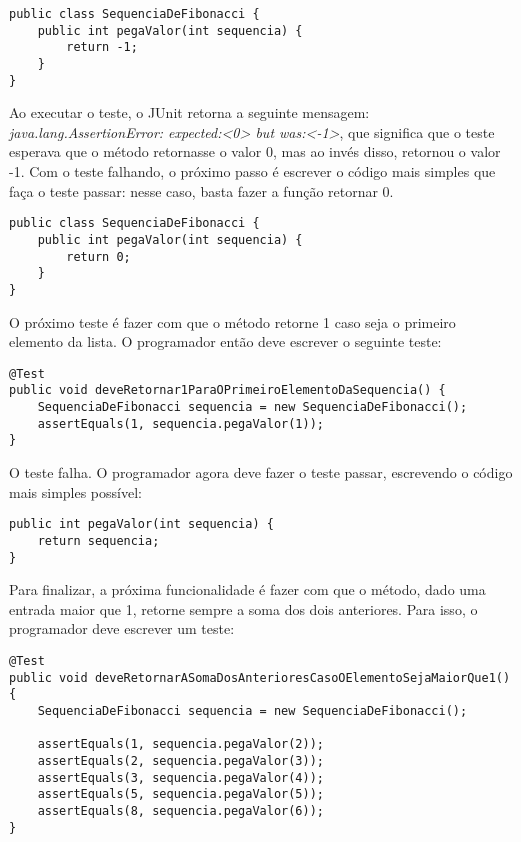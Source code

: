 \begin{lstlisting}[frame=trbl]
public class SequenciaDeFibonacci {
	public int pegaValor(int sequencia) {
		return -1;
	}
}
\end{lstlisting}

Ao executar o teste, o JUnit retorna a seguinte mensagem: \textit{java.lang.AssertionError: expected:<0> but was:<-1>}, que significa que
o teste esperava que o método retornasse o valor 0, mas ao invés disso, retornou o valor -1. Com o teste falhando, o próximo passo é escrever
o código mais simples que faça o teste passar: nesse caso, basta fazer a função retornar 0.

\begin{lstlisting}[frame=trbl]
public class SequenciaDeFibonacci {
	public int pegaValor(int sequencia) {
		return 0;
	}
}
\end{lstlisting}

O próximo teste é fazer com que o método retorne 1 caso seja o primeiro elemento da lista. O programador então deve escrever o
seguinte teste:

\begin{lstlisting}[frame=trbl]
@Test
public void deveRetornar1ParaOPrimeiroElementoDaSequencia() {
	SequenciaDeFibonacci sequencia = new SequenciaDeFibonacci();
	assertEquals(1, sequencia.pegaValor(1));		
}
\end{lstlisting}

O teste falha. O programador agora deve fazer o teste passar, escrevendo o código mais simples possível:

\begin{lstlisting}[frame=trbl]
public int pegaValor(int sequencia) {
	return sequencia;
}
\end{lstlisting}

Para finalizar, a próxima funcionalidade é fazer com que o método, dado uma entrada maior que 1, retorne sempre a soma dos dois anteriores.
Para isso, o programador deve escrever um teste:

\begin{lstlisting}[frame=trbl]
@Test
public void deveRetornarASomaDosAnterioresCasoOElementoSejaMaiorQue1() {
	SequenciaDeFibonacci sequencia = new SequenciaDeFibonacci();

	assertEquals(1, sequencia.pegaValor(2));
	assertEquals(2, sequencia.pegaValor(3));	
	assertEquals(3, sequencia.pegaValor(4));
	assertEquals(5, sequencia.pegaValor(5));
	assertEquals(8, sequencia.pegaValor(6));
}
\end{lstlisting}

